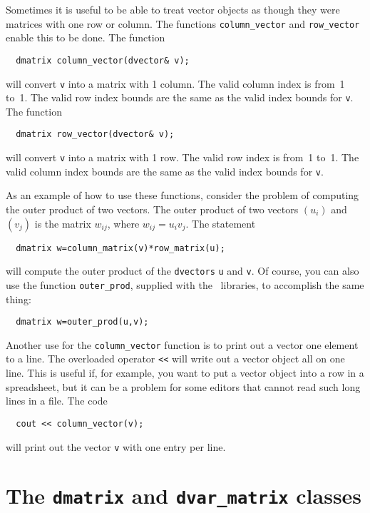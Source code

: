 \documentclass{admbmanual}
\begin{document}
Sometimes it is useful to be able to treat vector objects as though they were
matrices with one row or column. The functions \texttt{column\_vector} and
\texttt{row\_vector} enable this to be done. The function
\begin{lstlisting}
  dmatrix column_vector(dvector& v);
\end{lstlisting}
will convert \texttt{v} into a matrix with 1 column. The valid column index is
from~1 to~1. The valid row index bounds are the same as the valid index bounds
for \texttt{v}. The function
\begin{lstlisting}
  dmatrix row_vector(dvector& v);
\end{lstlisting}
will convert \texttt{v} into a matrix with 1 row. The valid row index is from~1
to~1. The valid column index bounds are the same as the valid index bounds for
\texttt{v}.

As an example of how to use these functions, consider the problem of computing
the outer product of two vectors. The outer product of two vectors $(u_i)$ and
$(v_j)$ is the matrix $w_{ij}$, where $w_{ij}=u_iv_j$. The statement
\begin{lstlisting}
  dmatrix w=column_matrix(v)*row_matrix(u);
\end{lstlisting}
will compute the outer product of the \texttt{dvectors} \texttt{u} and
\texttt{v}. Of course, you can also use the function \texttt{outer\_prod},
supplied with the \scAD\ libraries, to accomplish the same thing:
\begin{lstlisting}
  dmatrix w=outer_prod(u,v);
\end{lstlisting}

Another use for the \texttt{column\_vector} function is to print out a vector
one element to a line. The overloaded operator \texttt{<{}<} will write out a
vector object all on one line. This is useful if, for example, you want to put a
vector object into a row in a spreadsheet, but it can be a problem for some
editors that cannot read such long lines in a file. The code
\begin{lstlisting}
  cout << column_vector(v);
\end{lstlisting}
will print out the vector \texttt{v} with one entry per line.

\section{The \texttt{dmatrix} and \texttt{dvar\_matrix} classes}
\end{document}

